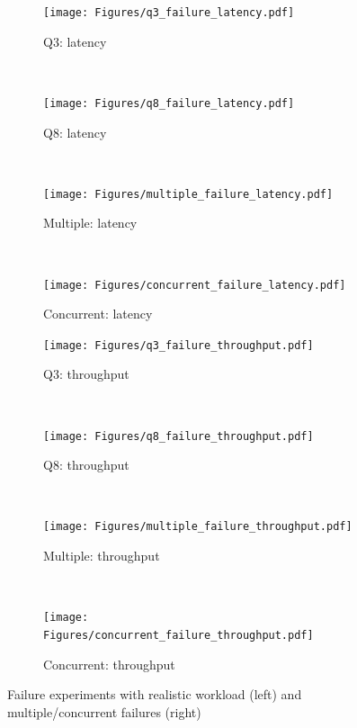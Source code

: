 \documentclass[sigconf]{acmart}
\begin{document}
\begin{figure}[!t]
	\begin{subfigure}[t]{0.25\textwidth}
		\centering
		\texttt{[image: Figures/q3\_failure\_latency.pdf]}
		\caption{Q3: latency}
		\label{fig:nexmark-q3-l}
	\end{subfigure}%
	~
	\begin{subfigure}[t]{0.25\textwidth}
		\centering
		\texttt{[image: Figures/q8\_failure\_latency.pdf]}
		\caption{Q8: latency}
		\label{fig:nexmark-q8-l}
	\end{subfigure}%
	~
	\begin{subfigure}[t]{.25\textwidth}
		\centering
		\texttt{[image: Figures/multiple\_failure\_latency.pdf]}
		\caption{Multiple: latency}
		\label{fig:multiple-l}
	\end{subfigure}%
	~
	\begin{subfigure}[t]{.25\textwidth}
		\centering
		\texttt{[image: Figures/concurrent\_failure\_latency.pdf]}
		\caption{Concurrent: latency}
		\label{fig:concurrent-l}
	\end{subfigure}%


	\begin{subfigure}[t]{0.25\textwidth}
		\centering
		\texttt{[image: Figures/q3\_failure\_throughput.pdf]}
		\caption{Q3: throughput}
		\label{fig:nexmark-q3-t}
	\end{subfigure}%
	~
	\begin{subfigure}[t]{0.25\textwidth}
		\centering
		\texttt{[image: Figures/q8\_failure\_throughput.pdf]}
		\caption{Q8: throughput}
		\label{fig:nexmark-q8-t}
	\end{subfigure}%
	~
	\begin{subfigure}[t]{.25\textwidth}
		\centering
		\texttt{[image: Figures/multiple\_failure\_throughput.pdf]}
		\caption{Multiple: throughput}
		\label{fig:multiple-t}
	\end{subfigure}%
	~
	\begin{subfigure}[t]{.25\textwidth}
		\centering
		\texttt{[image: Figures/concurrent\_failure\_throughput.pdf]}
		\caption{Concurrent: throughput}
		\label{fig:concurrent-t}
	\end{subfigure}%
	\vspace{-2mm}
	\caption{Failure experiments with realistic workload (left) and multiple/concurrent failures (right)}
  \label{fig:experiment-grid}
  	\vspace{-2mm}
\end{figure}
\end{document}
